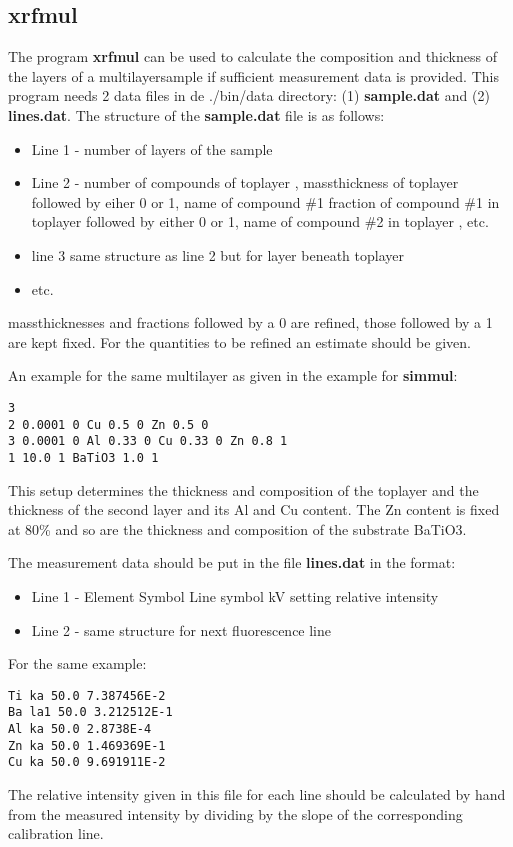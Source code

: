 \subsection{xrfmul}
The program {\bf xrfmul} can be used to calculate the composition and
thickness of the layers of a multilayersample if sufficient measurement data is provided. This program needs 2 data files in de ./bin/data directory:
(1) {\bf sample.dat} and (2) {\bf lines.dat}.
The structure of the {\bf sample.dat} file is as follows:\\
\begin{itemize}
\item Line 1 - number of layers of the sample
\item Line 2 - number of compounds of toplayer , massthickness of toplayer followed by eiher 0 or 1, 
name of compound \#1 fraction of compound \#1 in toplayer followed by either 0 or 1, name of compound \#2 in toplayer , etc.
\item line 3 same structure as line 2 but for layer beneath toplayer
\item etc.
\end{itemize}

massthicknesses and fractions followed by a 0 are refined, those followed
by a 1 are kept fixed.  For the quantities to be refined an estimate should be 
given.

An example for the same multilayer as given in the example for {\bf simmul}:\\
\begin{verbatim}
3
2 0.0001 0 Cu 0.5 0 Zn 0.5 0
3 0.0001 0 Al 0.33 0 Cu 0.33 0 Zn 0.8 1
1 10.0 1 BaTiO3 1.0 1
\end{verbatim}
This setup determines the thickness and composition of the toplayer and the thickness of
the second layer and its Al and Cu content. The Zn  content is fixed at 80\% and so are
the thickness and composition of the substrate BaTiO3.

The measurement data should be put in the file {\bf lines.dat} in the format:\\
\begin{itemize}
\item Line 1 - Element Symbol Line symbol kV setting relative intensity
\item Line 2 - same structure for next fluorescence line
\end{itemize}

For the same example:
\begin{verbatim}
Ti ka 50.0 7.387456E-2
Ba la1 50.0 3.212512E-1
Al ka 50.0 2.8738E-4
Zn ka 50.0 1.469369E-1
Cu ka 50.0 9.691911E-2
\end{verbatim}
The relative intensity given in this file for each line should be calculated by hand
from the measured intensity by dividing by the slope of the corresponding calibration line.

